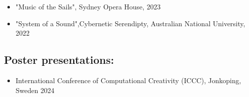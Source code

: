 \begin{itemize}
    \item "Music of the Sails", Sydney Opera House, 2023
    \item "System of a Sound",Cybernetic Serendipty, Australian National University, 2022
\end{itemize}

\subsection*{Poster presentations:}

\begin{itemize}
    \item International Conference of Computational Creativity (ICCC), Jonkoping, Sweden 2024
\end{itemize}


